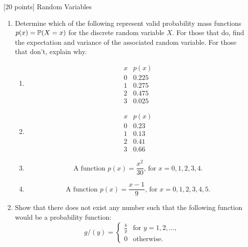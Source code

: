 [20 points] Random Variables\
\begin{enumerate}
    \item Determine which of the following represent valid probability mass functions $p(x) = \mathbb{P}(X=x)$ for the discrete random variable $X$. For those that do, find the expectation and variance of the associated random variable. For those that don't, explain why.
    \begin{enumerate}
        \item 
        $$\begin{array}{c|c}x&p(x)\\\hline0&0.225\\1&0.275\\2&0.475\\3&0.025\end{array}$$
        \item 
        $$\begin{array}{c|c}x&p(x)\\\hline0&0.23\\1&0.13\\2&0.41\\3&0.66\end{array}$$
        \item $$\text{A function }p(x)=\frac{x^2}{30}\text{, for }x=0,1,2,3,4.$$
        \item $$\text{A function }p(x)=\frac{x-1}{9}\text{, for }x=0,1,2,3,4,5.$$
    \end{enumerate}


    \vspace{0.1in}
    \item Show that there does not exist any number such that the following function would be a probability function:
    \[
    g/(y) = 
    \begin{cases} 
    \frac{b}{y} & \text{for } y = 1, 2, \dots, \\
    0 & \text{otherwise.}
    \end{cases}
    \]


\end{enumerate}